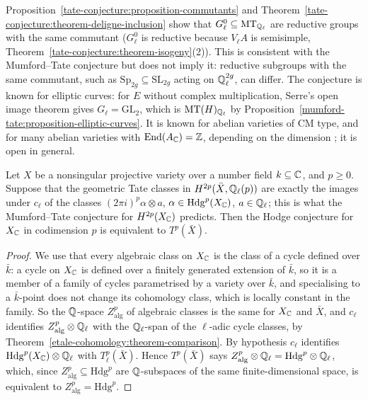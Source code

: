 \begin{remark}\label{tate-conjecture:remark-mumford-tate-known}
Proposition~\ref{tate-conjecture:proposition-commutants} and Theorem~\ref{tate-conjecture:theorem-deligne-inclusion} show that $G_\ell^0 \subseteq \mathrm{MT}_{\mathbb{Q}_\ell}$ are reductive groups with the same
commutant ($G_\ell^0$ is reductive because $V_\ell A$ is semisimple, Theorem~\ref{tate-conjecture:theorem-isogeny}(2)). This is consistent with the Mumford--Tate conjecture but does not imply it:
reductive subgroups with the same commutant, such as $\mathrm{Sp}_{2g} \subseteq \mathrm{SL}_{2g}$ acting on $\mathbb{Q}_\ell^{2g}$, can differ. The conjecture is known for elliptic curves: for $E$ without complex
multiplication, Serre's open image theorem \cite{serre-1972} gives $G_\ell = \mathrm{GL}_2$, which is $\mathrm{MT}(H)_{\mathbb{Q}_\ell}$ by Proposition~\ref{mumford-tate:proposition-elliptic-curves}. It is known for
abelian varieties of CM type, and for many abelian varieties with $\operatorname{End}(A_{\mathbb{C}}) = \mathbb{Z}$, depending on the dimension \cite{pink-1998}; it is open in general.
\end{remark}

\begin{proposition}\label{tate-conjecture:proposition-hodge-tate}
Let $X$ be a nonsingular projective variety over a number field $k \subseteq \mathbb{C}$, and $p \geq 0$. Suppose that the geometric Tate classes in $H^{2p}(\bar X, \mathbb{Q}_\ell(p))$ are exactly the images under $c_\ell$
of the classes $(2\pi i)^p\alpha \otimes a$, $\alpha \in \mathrm{Hdg}^p(X_{\mathbb{C}})$, $a \in \mathbb{Q}_\ell$; this is what the Mumford--Tate conjecture for $H^{2p}(X_{\mathbb{C}})$ predicts. Then the Hodge conjecture for $X_{\mathbb{C}}$
in codimension $p$ is equivalent to $T^p(\bar X)$.
\end{proposition}

\begin{proof}
We use that every algebraic class on $X_{\mathbb{C}}$ is the class of a cycle defined over $\bar k$: a cycle on $X_{\mathbb{C}}$ is defined over a finitely generated extension of $\bar k$, so it is a member of a family of cycles
parametrised by a variety over $\bar k$, and specialising to a $\bar k$-point does not change its cohomology class, which is locally constant in the family. So the $\mathbb{Q}$-space $Z^p_{\mathrm{alg}}$ of algebraic
classes is the same for $X_{\mathbb{C}}$ and $\bar X$, and $c_\ell$ identifies $Z^p_{\mathrm{alg}} \otimes \mathbb{Q}_\ell$ with the $\mathbb{Q}_\ell$-span of the $\ell$-adic cycle classes, by Theorem~\ref{etale-cohomology:theorem-comparison}.
By hypothesis $c_\ell$ identifies $\mathrm{Hdg}^p(X_{\mathbb{C}}) \otimes \mathbb{Q}_\ell$ with $T^p_\ell(\bar X)$. Hence $T^p(\bar X)$ says $Z^p_{\mathrm{alg}} \otimes \mathbb{Q}_\ell = \mathrm{Hdg}^p \otimes \mathbb{Q}_\ell$, which, since
$Z^p_{\mathrm{alg}} \subseteq \mathrm{Hdg}^p$ are $\mathbb{Q}$-subspaces of the same finite-dimensional space, is equivalent to $Z^p_{\mathrm{alg}} = \mathrm{Hdg}^p$.
\end{proof}

